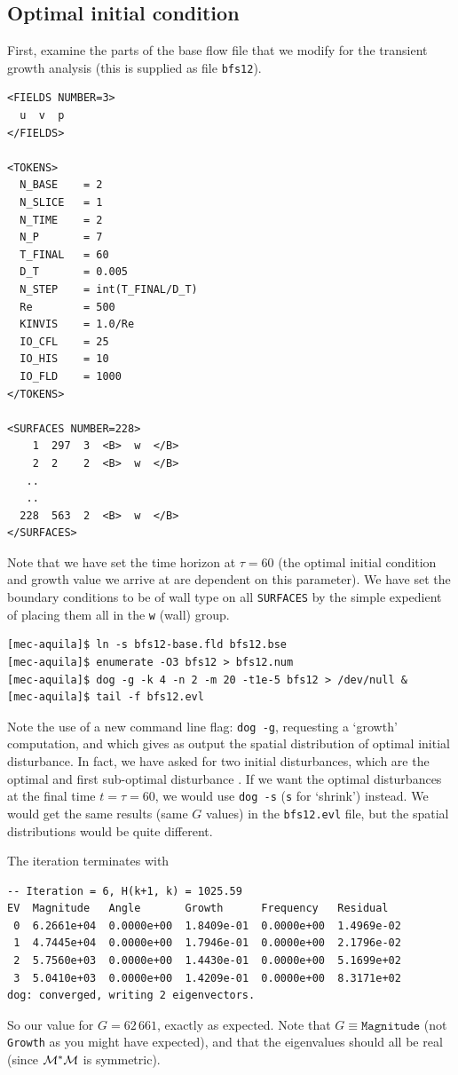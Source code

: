 \documentclass[11pt,a4paper]{report}
\newcommand\Mop{{\cal M}}
\newcommand\Madj{{\cal M^*}}
\begin{document}
\subsection{Optimal initial condition}
\label{sec.bfstg}

First, examine the parts of the base flow file that we modify for the
transient growth analysis (this is supplied as file \verb+bfs12+).
{\small
\begin{verbatim}
<FIELDS NUMBER=3>
  u  v  p
</FIELDS>

<TOKENS>
  N_BASE    = 2
  N_SLICE   = 1
  N_TIME    = 2
  N_P       = 7
  T_FINAL   = 60
  D_T       = 0.005
  N_STEP    = int(T_FINAL/D_T)
  Re        = 500
  KINVIS    = 1.0/Re
  IO_CFL    = 25
  IO_HIS    = 10
  IO_FLD    = 1000
</TOKENS>

<SURFACES NUMBER=228>
    1  297  3  <B>  w  </B>
    2  2    2  <B>  w  </B>
   ..
   ..
  228  563  2  <B>  w  </B>
</SURFACES>
\end{verbatim}
}\noindent Note that we have set the time horizon at $\tau=60$ (the
optimal initial condition and growth value we arrive at are dependent
on this parameter).  We have set the boundary conditions to be of wall
type on all \verb+SURFACES+ by the simple expedient of placing them
all in the \verb+w+ (wall) group.
\begin{verbatim}
[mec-aquila]$ ln -s bfs12-base.fld bfs12.bse
[mec-aquila]$ enumerate -O3 bfs12 > bfs12.num
[mec-aquila]$ dog -g -k 4 -n 2 -m 20 -t1e-5 bfs12 > /dev/null &
[mec-aquila]$ tail -f bfs12.evl
\end{verbatim}
\noindent
Note the use of a new command line flag: \verb+dog -g+, requesting a
`growth' computation, and which gives as output the spatial
distribution of optimal initial disturbance.  In fact, we have asked
for two initial disturbances, which are the optimal and first
sub-optimal disturbance \citep[see \S\,4.2.1 and table~5
  of][]{bbs08a}.  If we want the optimal disturbances at the final
time $t=\tau=60$, we would use \verb+dog -s+ (\verb+s+ for `shrink')
instead.  We would get the same results (same $G$ values) in the
\verb+bfs12.evl+ file, but the spatial distributions would be quite
different.

The iteration terminates with
{\small
\begin{verbatim}
-- Iteration = 6, H(k+1, k) = 1025.59
EV  Magnitude   Angle       Growth      Frequency   Residual
 0  6.2661e+04  0.0000e+00  1.8409e-01  0.0000e+00  1.4969e-02
 1  4.7445e+04  0.0000e+00  1.7946e-01  0.0000e+00  2.1796e-02
 2  5.7560e+03  0.0000e+00  1.4430e-01  0.0000e+00  5.1699e+02
 3  5.0410e+03  0.0000e+00  1.4209e-01  0.0000e+00  8.3171e+02
dog: converged, writing 2 eigenvectors.
\end{verbatim}
}\noindent So our value for $G=62\,661$, exactly as expected.  Note
that $G\equiv\texttt{Magnitude}$ (not \verb+Growth+ as you might have
expected), and that the eigenvalues should all be real (since
$\Madj\Mop$ is symmetric).
\end{document}
